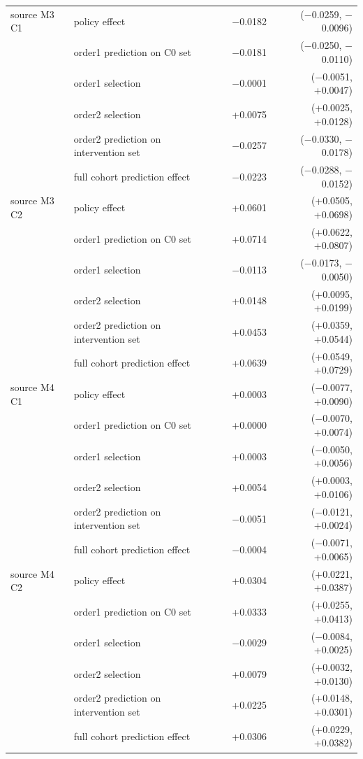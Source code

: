 \begin{longtable}{lllrr}
source M3 C1 & policy effect & & $-$0.0182 & ($-$0.0259, $-$0.0096)\\
 & order1 prediction on C0 set & & $-$0.0181 & ($-$0.0250, $-$0.0110)\\
 & order1 selection & & $-$0.0001 & ($-$0.0051, +0.0047)\\
 & order2 selection & & +0.0075 & (+0.0025, +0.0128)\\
 & order2 prediction on intervention set & & $-$0.0257 & ($-$0.0330, $-$0.0178)\\
 & full cohort prediction effect & & $-$0.0223 & ($-$0.0288, $-$0.0152)\\
source M3 C2 & policy effect & & +0.0601 & (+0.0505, +0.0698)\\
 & order1 prediction on C0 set & & +0.0714 & (+0.0622, +0.0807)\\
 & order1 selection & & $-$0.0113 & ($-$0.0173, $-$0.0050)\\
 & order2 selection & & +0.0148 & (+0.0095, +0.0199)\\
 & order2 prediction on intervention set & & +0.0453 & (+0.0359, +0.0544)\\
 & full cohort prediction effect & & +0.0639 & (+0.0549, +0.0729)\\
source M4 C1 & policy effect & & +0.0003 & ($-$0.0077, +0.0090)\\
 & order1 prediction on C0 set & & +0.0000 & ($-$0.0070, +0.0074)\\
 & order1 selection & & +0.0003 & ($-$0.0050, +0.0056)\\
 & order2 selection & & +0.0054 & (+0.0003, +0.0106)\\
 & order2 prediction on intervention set & & $-$0.0051 & ($-$0.0121, +0.0024)\\
 & full cohort prediction effect & & $-$0.0004 & ($-$0.0071, +0.0065)\\
source M4 C2 & policy effect & & +0.0304 & (+0.0221, +0.0387)\\
 & order1 prediction on C0 set & & +0.0333 & (+0.0255, +0.0413)\\
 & order1 selection & & $-$0.0029 & ($-$0.0084, +0.0025)\\
 & order2 selection & & +0.0079 & (+0.0032, +0.0130)\\
 & order2 prediction on intervention set & & +0.0225 & (+0.0148, +0.0301)\\
 & full cohort prediction effect & & +0.0306 & (+0.0229, +0.0382)\\
\bottomrule
\end{longtable}
